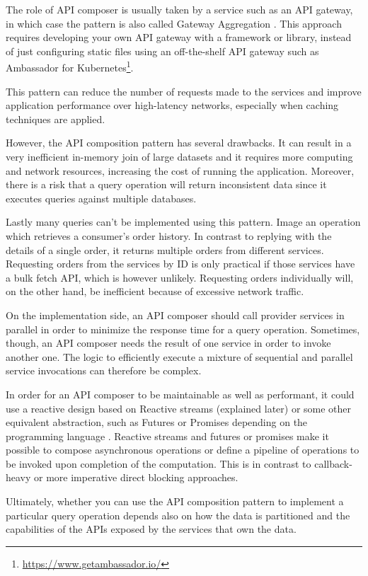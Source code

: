 \documentclass[conference]{IEEEtran}
\begin{document}
The role of API composer is usually taken by a service such as an API gateway, in which case the pattern is also called Gateway Aggregation \cite{gateway-aggregation}. This approach requires developing your own API gateway with a framework or library, instead of just configuring static files using an off-the-shelf API gateway such as Ambassador for Kubernetes\footnote{\url{https://www.getambassador.io/}}. 

This pattern can reduce the number of requests made to the services and improve application performance over high-latency networks, especially when caching techniques are applied.

However, the API composition pattern has several drawbacks. It can result in a very inefficient in-memory join of large datasets and it requires more computing and network resources, increasing the cost of running the application. Moreover, there is a risk that a query operation will return inconsistent data since it executes queries against multiple databases.

Lastly many queries can't be implemented using this pattern. Image an operation which retrieves a consumer's order history. In contrast to replying with the details of a single order, it returns multiple orders from different services. Requesting orders from the services by ID is only practical if those services have a bulk fetch API, which is however unlikely. Requesting orders individually will, on the other hand, be inefficient because of excessive network traffic.

On the implementation side, an API composer should call provider services in parallel in order to minimize the response time for a query operation. Sometimes, though, an API composer needs the result of one service in order to invoke another one. The logic to efficiently execute a mixture of sequential and parallel service invocations can therefore be complex.

In order for an API composer to be maintainable as well as performant, it could use a reactive design based on Reactive streams (explained later) or some other equivalent abstraction, such as Futures or Promises depending on the programming language \cite{futures-and-promises}. Reactive streams and futures or promises make it possible to compose asynchronous operations or define a pipeline of operations to be invoked upon completion of the computation. This is in contrast to callback-heavy or more imperative direct blocking approaches.

Ultimately, whether you can use the API composition pattern to implement a particular query operation depends also on how the data is partitioned and the capabilities of the APIs exposed by the services that own the data. 
\end{document}

